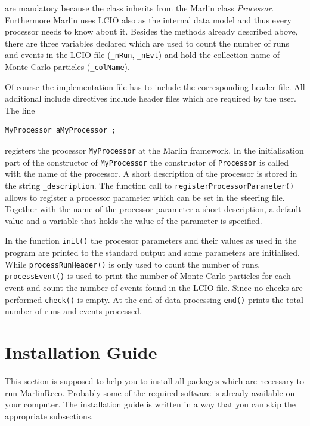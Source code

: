 are mandatory because the class inherits from the Marlin class
{\em Processor}. Furthermore Marlin uses LCIO also as the internal data model 
and thus every processor needs to know about it. 
Besides the methods already described above, there are three variables 
declared which are used to count the number of runs and events in the
LCIO file ({\tt \_nRun}, {\tt \_nEvt}) and hold the collection name of 
Monte Carlo particles ({\tt \_colName}). 

Of course the implementation file has to include the corresponding 
header file. All additional include directives include header files
which are required by the user. The line

\begin{verbatim}
MyProcessor aMyProcessor ;
\end{verbatim}

registers the processor {\tt MyProcessor} at the Marlin framework.
In the initialisation part of the constructor of 
{\tt MyProcessor} the constructor of {\tt Processor} is called with the
name of the processor. A short description of the processor is 
stored in the string {\tt \_description}. The function call to
{\tt registerProcessorParameter()} allows to register a processor parameter
which can be set in the steering file. Together with the name of the 
processor parameter a short description, a default value and a variable
that holds the value of the parameter is specified. 

In the function {\tt init()} the processor parameters and their 
values as used in the program are printed to the standard output and 
some parameters are initialised. While 
{\tt processRunHeader()} is only used to count the number of runs,
{\tt processEvent()} is used to print the number of Monte Carlo particles for 
each event and count the number of events found in the LCIO file.
Since no checks are performed {\tt check()} is empty.
At the end of data processing {\tt end()} prints the total number of 
runs and events processed. 

\section{Installation Guide} \label{sec:install}

This section is supposed to help you to install all packages which are 
necessary to run MarlinReco. Probably some of the required software is 
already available on your computer. The installation guide is written 
in a way that you can skip the appropriate subsections. 

